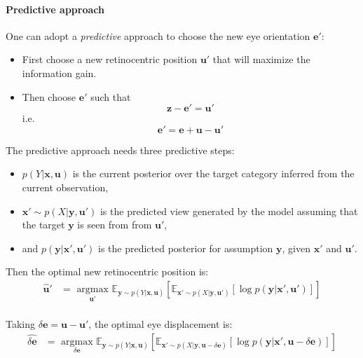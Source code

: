 \paragraph{Predictive approach}
One can adopt a \emph{predictive} approach to choose the new eye orientation $\boldsymbol{e}'$:
\begin{itemize}
	\item First choose a new retinocentric position $\boldsymbol{u}'$ that will maximize the  information gain.
	\item Then choose $\boldsymbol{e}'$ such that $$\boldsymbol{z} - \boldsymbol{e}' = \boldsymbol{u}'$$ i.e. $$\boldsymbol{e}' = \boldsymbol{e} + \boldsymbol{u} - \boldsymbol{u}'$$
\end{itemize}

The predictive approach needs three predictive steps:
\begin{itemize}
	\item $p(Y|\boldsymbol{x}, \boldsymbol{u})$ is the current posterior over the target category inferred from the current observation,
	\item $\boldsymbol{x}'\sim p(X|\boldsymbol{y},\boldsymbol{u}')$ is the predicted view generated by the model assuming that the target $\boldsymbol{y}$ is seen from from $\boldsymbol{u}'$,
	\item and $p(\boldsymbol{y}|\boldsymbol{x}', \boldsymbol{u}')$ is the predicted posterior for   assumption $\boldsymbol{y}$, given $\boldsymbol{x}'$ and $\boldsymbol{u}'$.
\end{itemize}

Then the optimal new retinocentric position is:
\begin{align*}
\hat{\boldsymbol{u}}' &= \underset{\boldsymbol{u}' }{\text{ argmax }} 
 \mathbb{E}_{\boldsymbol{y}\sim p(Y|\boldsymbol{x}, \boldsymbol{u})}  
 \left[\mathbb{E}_{ \boldsymbol{x}' \sim p(X|\boldsymbol{y}, \boldsymbol{u}')}
 \left[\log p(\boldsymbol{y}|\boldsymbol{x}', \boldsymbol{u}')\right]\right]\\
\end{align*}

Taking $\delta \boldsymbol{e} = \boldsymbol{u} - \boldsymbol{u}'$, the optimal eye displacement is: 
\begin{align*}
\widehat{\delta\boldsymbol{e}} &= \underset{\delta\boldsymbol{e} }{\text{ argmax }} 
\mathbb{E}_{\boldsymbol{y}\sim p(Y|\boldsymbol{x}, \boldsymbol{u})}  
\left[\mathbb{E}_{ \boldsymbol{x}' \sim p(X|\boldsymbol{y}, \boldsymbol{u}- \delta \boldsymbol{e})}
\left[\log p(\boldsymbol{y}|\boldsymbol{x}', \boldsymbol{u}-\delta\boldsymbol{e})\right]\right]\\
\end{align*}

